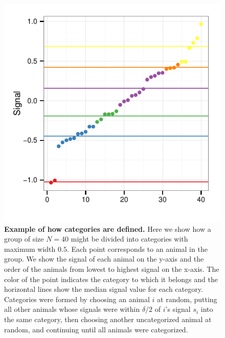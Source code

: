\begin{figure}[ht]
\includegraphics[width=.8\textwidth]{figures/categories.pdf}
\caption{\sffamily\small\textbf{Example of how categories are defined.}
Here we show how a group of size $N=40$ might be divided into categories with maximum width $0.5$. Each point corresponds to an animal in the group. We show the signal of each animal on the y-axis and the order of the animals from lowest to highest signal on the x-axis. The color of the point indicates the category to which it belongs and the horizontal lines show the median signal value for each category. Categories were formed by choosing an animal $i$ at random, putting all other animals whose signals were within $\delta/2$ of $i$'s signal $s_i$ into the same category, then choosing another uncategorized animal at random, and continuing until all animals were categorized.}
 \label{cats_ex}
\end{figure}

